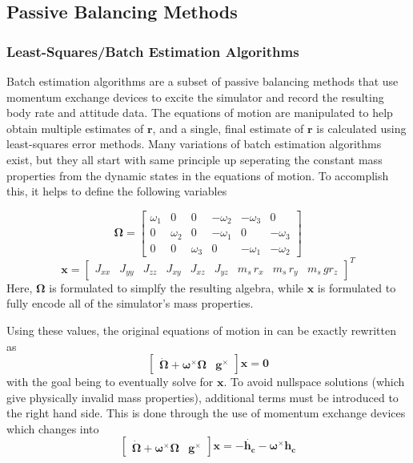 \subsection{Passive Balancing Methods}
\subsubsection{Least-Squares/Batch Estimation Algorithms}\label{sec:LSR}

Batch estimation algorithms are a subset of passive balancing methods that use momentum exchange devices to excite the simulator and record the resulting body rate and attitude data. The equations of motion are manipulated to help obtain multiple estimates of $\bm{r}$, and a single, final estimate of $\bm{r}$ is calculated using least-squares error methods. Many variations of batch estimation algorithms exist, but they all start with same principle up seperating the constant mass properties from the dynamic states in the equations of motion. To accomplish this, it helps to define the following variables

\begin{equation}
    \bm{\Omega} =
        \begin{bmatrix}
            \omega_1 & 0 & 0 & -\omega_2 & -\omega_3 & 0 \\
            0 & \omega_2 & 0 & -\omega_1 & 0 & -\omega_3 \\
            0 & 0 & \omega_3 & 0 & -\omega_1 & -\omega_2
        \end{bmatrix}
\end{equation}
\begin{equation}
    \bm{x} = \begin{bmatrix}
        J_{xx} & J_{yy} & J_{zz} & J_{xy} & J_{xz} & J_{yz} & m_s\,r_x & m_s\,r_y & m_s\,gr_z
    \end{bmatrix}^T
\end{equation}
Here, $\bm{\Omega}$ is formulated to simplfy the resulting algebra, while $\bm{x}$ is formulated to fully encode all of the simulator's mass properties.

Using these values, the original equations of motion in  can be exactly rewritten as 
\begin{equation}\label{equation:no_MEDs}
    \begin{bmatrix}
        \dot{\bm{\Omega}}+\bm{\omega}^{\times}\bm{\Omega} & \bm{g}^{\times}
    \end{bmatrix}\bm{x}
    =\bm{0}
\end{equation}
with the goal being to eventually solve for $\bm{x}$. To avoid nullspace solutions (which give physically invalid mass properties), additional terms must be introduced to the right hand side. This is done through the use of momentum exchange devices which changes  into 
\begin{equation}\label{equation:with_MEDs}
    \begin{bmatrix}
    \dot{\bm{\Omega}}+\bm{\omega}^{\times}\bm{\Omega} & \bm{g}^{\times}
    \end{bmatrix}\bm{x}
    =-\dot{\bm{h_c}} - \bm{\omega}^{\times}\bm{h_c}
\end{equation}

